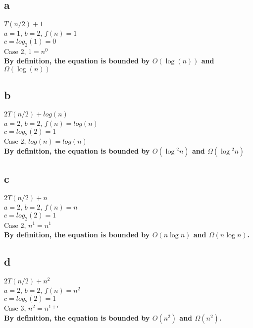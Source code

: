 \documentclass{article}
\begin{document}
\subsection{a}
$T(n/2)+1$\\
$a=1$, $b=2$, $f(n)=1$\\
$c=log_2 (1) = 0$\\
Case 2, $1 = n^0$\\
\textbf{By definition, the equation is bounded by $O(\log(n))$ and $\Omega(\log(n))$}
\subsection{b}
$2T(n/2)+log(n)$\\
$a=2$, $b=2$, $f(n)=log(n)$\\
$c=log_2 (2) = 1$\\
Case 2, $log (n) = log (n)$\\
\textbf{By definition, the equation is bounded by $O(\log{}^{2}n)$ and $\Omega(\log{}^{2}n)$}\\
\subsection{c}
$2T(n/2)+n$\\
$a=2$, $b=2$, $f(n)=n$\\
$c=log_2 (2) = 1$\\
Case 2, $n^1 = n^1$\\
\textbf{By definition, the equation is bounded by $O(n\log{}n)$ and $\Omega(n\log{}n)$.}\\
\subsection{d}
$2T(n/2)+n^2$\\
$a=2$, $b=2$, $f(n)=n^2$\\
$c=log_2 (2) = 1$\\
Case 3, $n^2 = n^{1+\epsilon}$\\
\textbf{By definition, the equation is bounded by $O(n^{2})$ and $\Omega(n^{2})$.}\\
\end{document}
